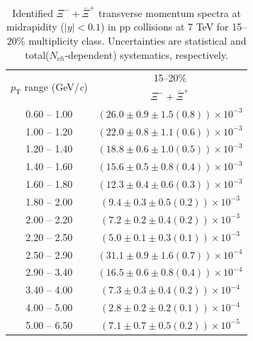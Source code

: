 \begin{table}
\caption{Identified $\Xi^{-} + \bar{\Xi}^{+}$ transverse momentum spectra at midrapidity ($|y|<0.1$) in pp collisions at 7 TeV for 15--20\% multiplicity class. Uncertainties are statistical and total($N_{ch}$-dependent) systematics, respectively.}
\label{tab:XiSum_15to20}
\begin{center}
\begin{tabular}{ c | c }
\hline
\multirow{2}{*}{$p_{\mathrm{T}}$ range (GeV/\textit{c})} & \multicolumn{1}{c}{15--20\%} \\ & $\Xi^{-} + \bar{\Xi}^{+}$\\ 
\hline
0.60 -- 1.00 & $(26.0\pm0.9\pm1.5(0.8))\times10^{-3}$ \\ 
1.00 -- 1.20 & $(22.0\pm0.8\pm1.1(0.6))\times10^{-3}$ \\ 
1.20 -- 1.40 & $(18.8\pm0.6\pm1.0(0.5))\times10^{-3}$ \\ 
1.40 -- 1.60 & $(15.6\pm0.5\pm0.8(0.4))\times10^{-3}$ \\ 
1.60 -- 1.80 & $(12.3\pm0.4\pm0.6(0.3))\times10^{-3}$ \\ 
1.80 -- 2.00 & $(9.4\pm0.3\pm0.5(0.2))\times10^{-3}$ \\ 
2.00 -- 2.20 & $(7.2\pm0.2\pm0.4(0.2))\times10^{-3}$ \\ 
2.20 -- 2.50 & $(5.0\pm0.1\pm0.3(0.1))\times10^{-3}$ \\ 
2.50 -- 2.90 & $(31.1\pm0.9\pm1.6(0.7))\times10^{-4}$ \\ 
2.90 -- 3.40 & $(16.5\pm0.6\pm0.8(0.4))\times10^{-4}$ \\ 
3.40 -- 4.00 & $(7.3\pm0.3\pm0.4(0.2))\times10^{-4}$ \\ 
4.00 -- 5.00 & $(2.8\pm0.2\pm0.2(0.1))\times10^{-4}$ \\ 
5.00 -- 6.50 & $(7.1\pm0.7\pm0.5(0.2))\times10^{-5}$ \\ 
\hline
\end{tabular}
\end{center}
\end{table}
 
